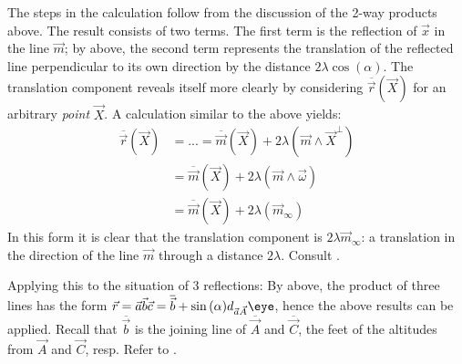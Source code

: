 \documentclass[12pt]{article}
\newcommand{\mydogblue}{{\color{gray} $\square$~~}}
\begin{document}
{\begin{figure}
\label{fig:glideref}
\end{figure}
The steps in the calculation follow from the discussion of the 2-way products above.
The result consists of two terms. The first term is the reflection of $\vec{x}$ in the line $\vec{m}$; by  above, the second term represents the translation of the reflected line perpendicular to its own direction by the distance $2\lambda \cos(\alpha)$.   %
The translation component reveals itself more clearly by considering $\overline{\vec{r}}(\vec{X})$ for an arbitrary \emph{point} $\vec{X}$.  A calculation similar to the above yields:
\begin{align*}
\overline{\vec{r}}(\vec{X}) &= ... = \overline{ \vec{m}}(\vec{X}) + 2 \lambda(\vec{m} \wedge \vec{X}^{\perp}) \\
&=  \overline{ \vec{m}}(\vec{X})  + 2 \lambda (\vec{m} \wedge \vec{\omega}) \\
&=  \overline{ \vec{m}}(\vec{X})  + 2 \lambda (\vec{m}_{\infty}) 
\end{align*}
In this form it is clear that the translation component is $2\lambda \vec{m}_{\infty}$: a translation in  the direction  of the line $\vec{m}$ through a distance $2\lambda$.  Consult .

Applying this to the situation of 3 reflections:  By  above, the product of three lines has the form $\vec{r} = \vec{a}\vec{b}\vec{c} = \overline{\vec{b}} + \sin{(\alpha)}d_{\vec{a}\vec{A}}\eye$, hence the above results can be applied. Recall that $\overline{\vec{b}}$ is the joining line of $\overline{\vec{A}}$ and $\overline{\vec{C}}$, the feet of the altitudes from $\vec{A}$ and $\vec{C}$, resp. Refer to .  %
%

}
\end{document}
